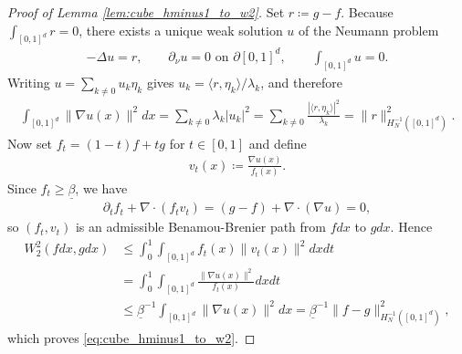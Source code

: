 \documentclass[11pt,reqno]{amsart}
\theoremstyle{definition}
\begin{document}
\begin{proof}[Proof of Lemma \ref{lem:cube_hminus1_to_w2}]
Set $r\coloneqq g-f$.
Because $\int_{[0,1]^d}r=0$, there exists a unique weak solution $u$ of the Neumann problem
\begin{align*}
    -\Delta u = r,
    \qquad
    \partial_\nu u = 0 \text{ on } \partial[0,1]^d,
    \qquad
    \int_{[0,1]^d}u = 0.
\end{align*}
Writing $u=\sum_{k\neq 0}u_k\eta_k$ gives $u_k = \langle r,\eta_k\rangle/\lambda_k$, and therefore
\begin{align*}
    \int_{[0,1]^d}\|\nabla u(x)\|^2 dx
    =
    \sum_{k\neq 0}\lambda_k |u_k|^2
    =
    \sum_{k\neq 0}\frac{|\langle r,\eta_k\rangle|^2}{\lambda_k}
    =
    \|r\|_{H^{-1}_N([0,1]^d)}^2.
\end{align*}
Now set $f_t=(1-t)f+t g$ for $t\in[0,1]$ and define
\begin{align*}
    v_t(x) \coloneqq \frac{\nabla u(x)}{f_t(x)}.
\end{align*}
Since $f_t\ge \underline\beta$, we have
\begin{align*}
    \partial_t f_t + \nabla \cdot(f_t v_t)
    =
    (g-f)+\nabla \cdot(\nabla u)
    =0,
\end{align*}
so $(f_t,v_t)$ is an admissible Benamou-Brenier path from $f dx$ to $g dx$.
Hence
\begin{align*}
    W_2^2(f dx,g dx)
    &\le
    \int_0^1\int_{[0,1]^d} f_t(x)\|v_t(x)\|^2 dx dt \\
    &=
    \int_0^1\int_{[0,1]^d}\frac{\|\nabla u(x)\|^2}{f_t(x)} dx dt \\
    &\le
    \underline\beta^{-1}\int_{[0,1]^d}\|\nabla u(x)\|^2 dx
    =
    \underline\beta^{-1}\|f-g\|_{H^{-1}_N([0,1]^d)}^2,
\end{align*}
which proves \eqref{eq:cube_hminus1_to_w2}.
\end{proof}
\end{document}
